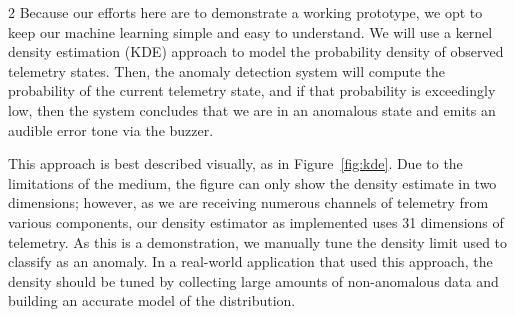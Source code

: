 \documentclass[10pt, fleqn]{article}
\begin{document}
\begin{multicols*}{2}
Because our efforts here are to demonstrate a working prototype,
we opt to keep our machine learning simple and easy to understand.
We will use a kernel density estimation (KDE) approach to
model the probability density of observed telemetry states.
Then, the anomaly detection system will
compute the probability of the current telemetry state,
and if that probability is exceedingly low,
then the system concludes that we are in an anomalous state
and emits an audible error tone via the buzzer.

This approach is best described visually,
as in Figure~\ref{fig:kde}.
Due to the limitations of the medium,
the figure can only show the density estimate in two dimensions;
however, as we are receiving numerous channels of telemetry from various components,
our density estimator as implemented uses 31 dimensions of telemetry.
As this is a demonstration,
we manually tune the density limit used to classify as an anomaly.
In a real-world application that used this approach,
the density should be tuned by collecting large amounts of non-anomalous data
and building an accurate model of the distribution.

\begin{figure}[t]
\begin{center}
\end{center}
\vspace*{-1.5em}
\label{fig:stationary_telem}
\end{figure}


\end{multicols*}
\end{document}
